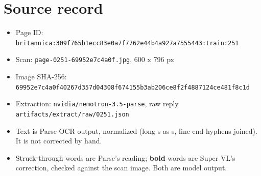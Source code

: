 \documentclass[10pt]{article}
\begin{document}
\section*{Source record}
\begin{itemize}
\item Page ID: \texttt{britannica:309f765b1ecc83e0a7f7762e44b4a927a7555443:train:251}
\item Scan: \texttt{page-0251-69952e7c4a0f.jpg}, 600 x 796 px
\item Image SHA-256: \texttt{\small 69952e7c4a0f40267d357d04308f674155b3ab206ce8f2f4887124ce481f8c1d}
\item Extraction: \texttt{nvidia/nemotron-3.5-parse}, raw reply \texttt{artifacts/extract/raw/0251.json}
\item Text is Parse OCR output, normalized (long s as s, line-end hyphens joined). It is not corrected by hand.
\item \sout{Struck-through} words are Parse's reading; \textbf{bold} words are Super VL's correction, checked against the scan image. Both are model output.
\end{itemize}
\end{document}
